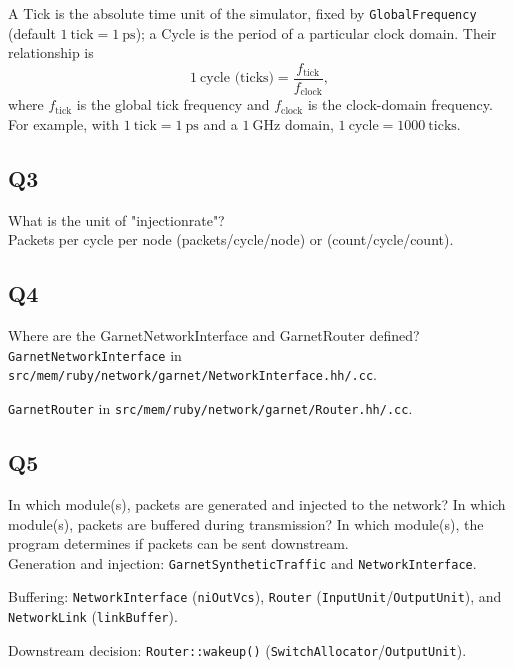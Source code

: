 \documentclass[11pt]{article}
\begin{document}
A Tick is the absolute time unit of the simulator, fixed by \texttt{GlobalFrequency} (default $1\ \text{tick}=1\ \text{ps}$); a Cycle is the period of a particular clock domain. Their relationship is
\[
1\ \text{cycle (ticks)} = \frac{f_{\text{tick}}}{f_{\text{clock}}},
\]
where $f_{\text{tick}}$ is the global tick frequency and $f_{\text{clock}}$ is the clock-domain frequency. For example, with $1\ \text{tick}=1\ \text{ps}$ and a $1\ \text{GHz}$ domain, $1\ \text{cycle}=1000\ \text{ticks}$.

\subsection*{Q3}
What is the unit of "injectionrate"?\\

Packets per cycle per node (packets/cycle/node) or (count/cycle/count).

\subsection*{Q4}
Where are the GarnetNetworkInterface and GarnetRouter defined?\\

\texttt{GarnetNetworkInterface} in \texttt{src/mem/ruby/network/garnet/NetworkInterface.hh/.cc}.

\texttt{GarnetRouter} in \texttt{src/mem/ruby/network/garnet/Router.hh/.cc}.


\subsection*{Q5}
In which module(s), packets are generated and injected to the network? In which module(s), packets are buffered during transmission? In which module(s), the program determines if packets can be sent downstream.\\

Generation and injection: \texttt{GarnetSyntheticTraffic} and \texttt{NetworkInterface}.

Buffering: \texttt{NetworkInterface} (\texttt{niOutVcs}), \texttt{Router} (\texttt{InputUnit}/\texttt{OutputUnit}), and \texttt{NetworkLink} (\texttt{linkBuffer}).

Downstream decision: \texttt{Router::wakeup()} (\texttt{SwitchAllocator}/\texttt{OutputUnit}).
\end{document}
